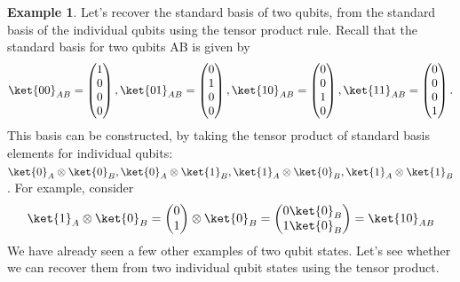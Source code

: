 \documentclass[12pt, oneside]{book}
\theoremstyle{definition}
\theoremstyle{definition}
\newtheorem{example}{Example}[section]
\theoremstyle{remark}
\begin{document}
\begin{example}
    Let’s recover the standard basis of two qubits, from the standard basis of the
individual qubits using the tensor product rule. Recall that the standard basis for two qubits AB is given by
\[
\ket{00}_{AB}=\begin{pmatrix} 1\\ 0 \\ 0\\ 0 \end{pmatrix}, \ket{01}_{AB}=\begin{pmatrix} 0 \\ 1 \\ 0 \\ 0 \end{pmatrix}, \ket{10}_{AB}=\begin{pmatrix} 0 \\ 0 \\1 \\ 0 \end{pmatrix}, \ket{11}_{AB}=\begin{pmatrix} 0 \\ 0 \\ 0 \\1\end{pmatrix}.
\]
This basis can be constructed, by taking the tensor product of standard basis elements for individual qubits: $\ket{0}_A \otimes \ket{0}_B, \ket{0}_A \otimes \ket{1}_B, \ket{1}_A\otimes \ket{0}_B, \ket{1}_A\otimes \ket{1}_B$. For example, consider
\[
\ket{1}_A\otimes \ket{0}_B = \begin{pmatrix} 0 \\ 1 \end{pmatrix} \otimes \ket{0}_B = \begin{pmatrix} 0 \ket{0}_B\\ 1 \ket{0}_B \end{pmatrix} = \ket{10}_{AB}
\]
We have already seen a few other examples of two qubit states. Let’s see whether we can
recover them from two individual qubit states using the tensor product.
\end{example}
\end{document}
